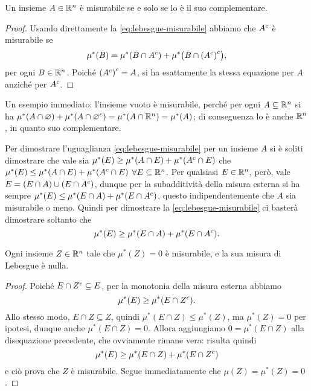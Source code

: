 \begin{proprieta} \label{pr:complementare-misurabile}
	Un insieme $A\in\mathbb{R}^n$ è misurabile se e solo se lo è il suo complementare.
\end{proprieta}
\begin{proof}
	Usando direttamente la \eqref{eq:lebesgue-misurabile} abbiamo che ${A}^c$ è misurabile se
	\begin{equation}
		\mu^*(B)=\mu^*(B\cap{A}^c)+\mu^*\big(B\cap{({A}^c)}^c\big),
	\end{equation}
	per ogni $B\in\mathbb{R}^n$.
Poich\'e ${({A}^c)}^c=A$, si ha esattamente la stessa equazione per $A$ anzich\'e per ${A}^c$.
\end{proof}
Un esempio immediato: l'insieme vuoto è misurabile, perch\'e per ogni $A\subseteq\mathbb{R}^n$ si ha $\mu^*(A\cap\varnothing)+\mu^*(A\cap{\varnothing}^c)=\mu^*(A\cap\mathbb{R}^n)=\mu^*(A)$; di conseguenza lo è anche $\mathbb{R}^n$, in quanto suo complementare.
\begin{osservazione}
	Per dimostrare l'uguaglianza \eqref{eq:lebesgue-misurabile} per un insieme $A$ si è soliti dimostrare che vale sia $\mu^*(E)\geq\mu^*(A\cap E)+\mu^*({A}^c\cap E)$ che $\mu^*(E)\leq\mu^*(A\cap E)+\mu^*({A}^c\cap E)$ $\forall E\subseteq\mathbb{R}^n$.
	Per qualsiasi $E\in\mathbb{R}^n$, però, vale $E=(E\cap A)\cup(E\cap{A}^c)$, dunque per la subadditività della misura esterna si ha sempre $\mu^*(E)\leq\mu^*(E\cap A)+\mu^*(E\cap{A}^c)$, questo indipendentemente che $A$ sia misurabile o meno.
	Quindi per dimostrare la \eqref{eq:lebesgue-misurabile}  ci basterà dimostrare soltanto che
	\begin{equation}
		\mu^*(E)\geq\mu^*(E\cap A)+\mu^*(E\cap{A}^c).
	\end{equation}
\end{osservazione}
\begin{proprieta} \label{pr:misura-nulla}
	Ogni insieme $Z\in\mathbb{R}^n$ tale che $\mu^*(Z)=0$ è misurabile, e la sua misura di Lebesgue è nulla.
\end{proprieta}
\begin{proof}
	Poich\'e $E\cap{Z}^c\subseteq E$, per la monotonia della misura esterna abbiamo
	\begin{equation}
		\mu^*(E)\geq\mu^*(E\cap{Z}^c).
	\end{equation}
	Allo stesso modo, $E\cap Z\subseteq Z$, quindi $\mu^*(E\cap Z)\leq\mu^*(Z)$, ma $\mu^*(Z)=0$ per ipotesi, dunque anche $\mu^*(E\cap Z)=0$.
	Allora aggiungiamo $0=\mu^*(E\cap Z)$ alla disequazione precedente, che ovviamente rimane vera: risulta quindi
	\begin{equation}
		\mu^*(E)\geq\mu^*(E\cap Z)+\mu^*(E\cap{Z}^c)
	\end{equation}
	e ciò prova che $Z$ è misurabile.
	Segue immediatamente che $\mu(Z)=\mu^*(Z)=0$.
\end{proof}
